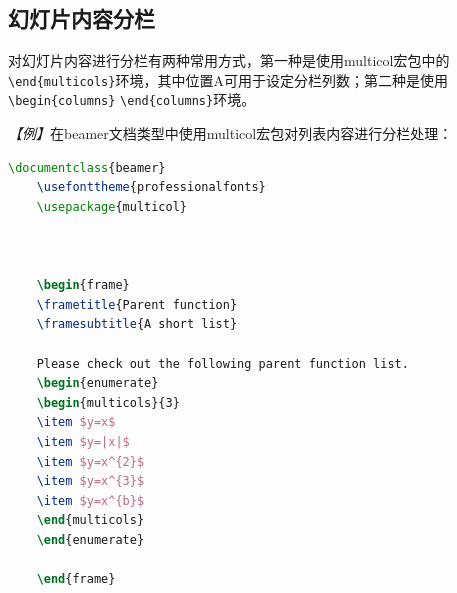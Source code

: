 \subsection{幻灯片内容分栏}

对幻灯片内容进行分栏有两种常用方式，第一种是使用multicol宏包中的 \texttt{\textbackslash{}end\{multicols\}}环境，其中位置A可用于设定分栏列数；第二种是使用\texttt{\textbackslash{}begin\{columns\}} \texttt{\textbackslash{}end\{columns\}}环境。

\emph{【例】}在beamer文档类型中使用multicol宏包对列表内容进行分栏处理：
\begin{lstlisting}[language=TeX]
    \documentclass{beamer}
    \usefonttheme{professionalfonts}
    \usepackage{multicol}

    

    \begin{frame}
    \frametitle{Parent function}
    \framesubtitle{A short list}

    Please check out the following parent function list.
    \begin{enumerate}
    \begin{multicols}{3}
    \item $y=x$
    \item $y=|x|$
    \item $y=x^{2}$
    \item $y=x^{3}$
    \item $y=x^{b}$
    \end{multicols}
    \end{enumerate}

    \end{frame}

    
\end{lstlisting}

